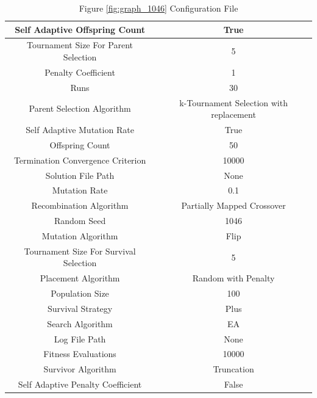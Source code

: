 \documentclass{standalone}
\begin{document}
\begin{table}[!htb]
	\centering
	\caption{Figure \ref{fig:graph_1046} Configuration File}
	\label{tab:graph_1046}
	\begin{tabular}{| c | c |}
		\hline
		Self Adaptive Offspring Count		& True		 \\
		\hline
		Tournament Size For Parent Selection		& 5		 \\
		\hline
		Penalty Coefficient		& 1		 \\
		\hline
		Runs		& 30		 \\
		\hline
		Parent Selection Algorithm		& k-Tournament Selection with replacement		 \\
		\hline
		Self Adaptive Mutation Rate		& True		 \\
		\hline
		Offspring Count		& 50		 \\
		\hline
		Termination Convergence Criterion		& 10000		 \\
		\hline
		Solution File Path		& None		 \\
		\hline
		Mutation Rate		& 0.1		 \\
		\hline
		Recombination Algorithm		& Partially Mapped Crossover		 \\
		\hline
		Random Seed		& 1046		 \\
		\hline
		Mutation Algorithm		& Flip		 \\
		\hline
		Tournament Size For Survival Selection		& 5		 \\
		\hline
		Placement Algorithm		& Random with Penalty		 \\
		\hline
		Population Size		& 100		 \\
		\hline
		Survival Strategy		& Plus		 \\
		\hline
		Search Algorithm		& EA		 \\
		\hline
		Log File Path		& None		 \\
		\hline
		Fitness Evaluations		& 10000		 \\
		\hline
		Survivor Algorithm		& Truncation		 \\
		\hline
		Self Adaptive Penalty Coefficient		& False		 \\
		\hline
	\end{tabular}
\end{table}
\end{document}
